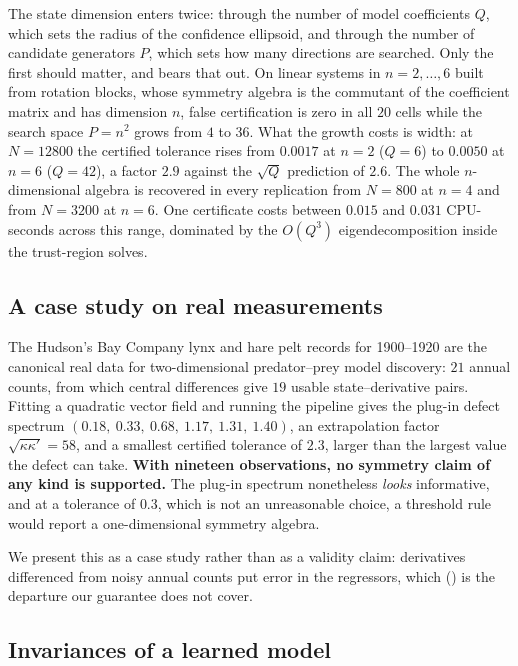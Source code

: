 The state dimension enters twice: through the number of model coefficients
$Q$, which sets the radius of the confidence ellipsoid, and through the number
of candidate generators $P$, which sets how many directions are searched. Only
the first should matter, and  bears that out. On linear
systems in $n = 2,\dots,6$ built from rotation blocks, whose symmetry algebra
is the commutant of the coefficient matrix and has dimension $n$, false
certification is zero in all $20$ cells while the search space $P = n^2$ grows
from $4$ to $36$. What the growth costs is width: at $N = 12800$ the certified
tolerance rises from $0.0017$ at $n=2$ ($Q=6$) to $0.0050$ at $n=6$ ($Q=42$),
a factor $2.9$ against the $\sqrt{Q}$ prediction of $2.6$. The whole
$n$-dimensional algebra is recovered in every replication from $N = 800$ at $n
= 4$ and from $N = 3200$ at $n = 6$. One certificate costs between $0.015$ and
$0.031$ CPU-seconds across this range, dominated by the $O(Q^3)$
eigendecomposition inside the trust-region solves.



\subsection{A case study on real measurements}
\label{sec:realdata}

The Hudson's Bay Company lynx and hare pelt records for 1900--1920 are the
canonical real data for two-dimensional predator--prey model discovery: $21$
annual counts, from which central differences give $19$ usable state--derivative pairs. Fitting a quadratic vector field and running the pipeline
gives the plug-in defect spectrum $(0.18,\ 0.33,\ 0.68,\ 1.17,\ 1.31,\ 1.40)$,
an extrapolation factor $\sqrt{\kappa\kappa'} = 58$, and a smallest certified
tolerance of $2.3$, larger than the largest value the defect can take.
\textbf{With nineteen observations, no symmetry claim of any kind is
supported.} The plug-in spectrum nonetheless \emph{looks} informative, and at
a tolerance of $0.3$, which is not an unreasonable choice, a threshold rule
would report a one-dimensional symmetry algebra.

We present this as a case study rather than as a validity claim: derivatives
differenced from noisy annual counts put error in the regressors, which
() is the departure our guarantee does not cover.

\subsection{Invariances of a learned model}
\label{sec:invariance}

